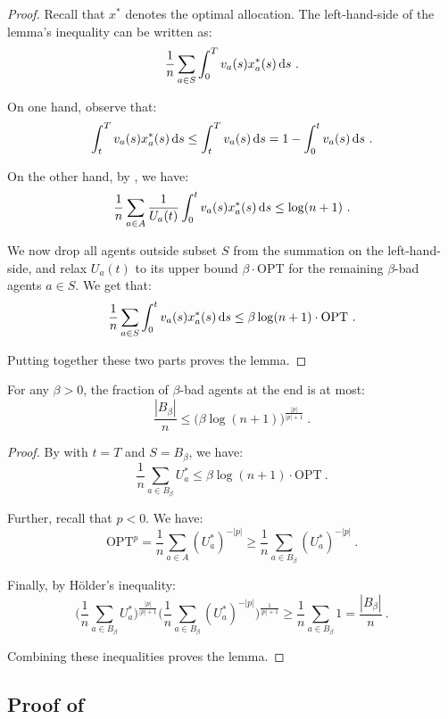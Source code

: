 \documentclass[11pt,letterpaper]{article}
\newcommand{\OPT}{\mathrm{OPT}}
\newcommand{\dif}[1]{\,\text{\rm d} #1}
\newcommand{\utility}{U}
\begin{document}
\begin{proof}
	Recall that $x^*$ denotes the optimal allocation.
	The left-hand-side of the lemma's inequality can be written as:
	\[
		\frac{1}{n} \sum_{a \in S} \int_0^T v_a(s) x^*_a(s) \dif{s}
		~.
	\]
	
	On one hand, observe that:
	\[
		\int_t^T v_a(s) x^*_a(s) \dif{s} \le \int_t^T v_a(s) \dif{s} = 1 - \int_0^t v_a(s) \dif{s}
		~.
	\]
	
	On the other hand, by , we have:
	\[
		\frac{1}{n} \sum_{a \in A} \frac{1}{\utility_a(t)} \int_0^t v_a(s) x^*_a(s) \dif{s} \le \log(n+1) 
		~.
	\]
	
	We now drop all agents outside subset $S$ from the summation on the left-hand-side, and relax $\utility_a(t)$ to its upper bound $\beta \cdot \OPT$ for the remaining $\beta$-bad agents $a \in S$.
	We get that:
	\[
		\frac{1}{n} \sum_{a \in S} \int_0^t v_a(s) x^*_a(s) \dif{s} \le \beta \log (n+1) \cdot \OPT
		~.
	\]	
	
	Putting together these two parts proves the lemma.
\end{proof}

\begin{lemma}
	\label{lem:bad-agents-number}	
	For any $\beta > 0$, the fraction of $\beta$-bad agents at the end is at most:
	\[
		\frac{|B_\beta|}{n} \le \big( \beta \log (n+1) \big)^{\frac{|p|}{|p|+1}}
		~.
	\]
\end{lemma}

\begin{proof}
	By  with $t = T$ and $S = B_\beta$, we have:
	\[
		\frac{1}{n} \sum_{a \in B_\beta} \utility_a^* \leq \beta \log (n+1) \cdot \OPT
		~.
	\]	
	
	Further, recall that $p < 0$.
	We have:
	\[
		\OPT^p = \frac{1}{n} \sum_{a \in A} (\utility_a^*)^{-|p|} \ge \frac{1}{n} \sum_{a \in B_\beta} (\utility_a^*)^{-|p|} 
		~.
	\]
	
	Finally, by H\"{o}lder's inequality:
	\[
		\bigg( \frac{1}{n} \sum_{a \in B_\beta} \utility_a^* \bigg)^{\frac{|p|}{|p|+1}} 
		\bigg( \frac{1}{n} \sum_{a \in B_\beta} (\utility_a^*)^{-|p|} \bigg)^{\frac{1}{|p|+1}} \ge \frac{1}{n} \sum_{a \in B_\beta} 1 = \frac{|B_\beta|}{n}
		~.
	\]
	
	Combining these inequalities proves the lemma.
\end{proof}



\subsection{Proof of }
\end{document}
